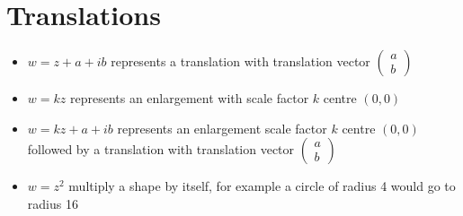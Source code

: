 \documentclass{article}[18pt]
\begin{document}
\section{Translations}
\begin{itemize}
\item $w=z+a+ib$ represents a translation with translation vector $\begin{pmatrix}
a\\b
\end{pmatrix}$
\item $w=kz$ represents an enlargement with scale factor $k$ centre $(0,0)$
\item $w=kz+a+ib$ represents an enlargement scale factor $k$ centre $(0,0)$ followed by a translation with translation vector $\begin{pmatrix}
a\\b
\end{pmatrix}$
\item $w=z^2$ multiply a shape by itself, for example a circle of radius 4 would go to radius 16
\end{itemize}
\end{document}
